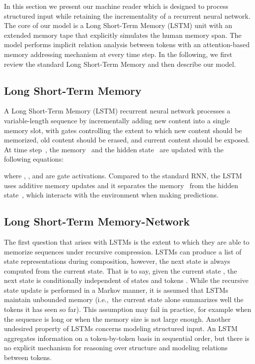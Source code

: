 \documentclass[11pt,letterpaper]{article}
\begin{document}
        In this section we present our machine reader which is
        designed to process structured input while retaining the
        incrementality of a recurrent neural network.  The core of our
        model is a Long Short-Term Memory (LSTM) unit with an extended
        memory tape that explicitly simulates the human memory
        span. The model performs implicit relation analysis between
        tokens with an attention-based memory addressing mechanism at
        every time step. In the following, we first review the
        standard Long Short-Term Memory and then describe our model.
	
	\subsection{Long Short-Term Memory}
	\label{sec:long-short-term-1}
	A Long Short-Term Memory (LSTM) recurrent neural network processes a
	variable-length sequence  by incrementally
	adding new content into a single memory slot, with gates controlling
	the extent to which new content should be memorized, old content
	should be erased, and current content should be exposed. At time
	step~, the memory~ and the hidden state~ are updated with
	the following equations:
	
	
	 
	where , , and  are gate activations. Compared to the
        standard RNN, the LSTM uses additive memory updates and it separates the memory~ from the
        hidden state~, which interacts with the environment when
        making predictions.
          
	 
	\subsection{Long Short-Term Memory-Network}
	\label{sec:long-short-term}
	The first question that arises with LSTMs is the extent to
        which they are able to memorize sequences under recursive
        compression.  LSTMs can produce a list of state
        representations during composition, however, the next state is
        always computed from the current state. That is to say, given
        the current state , the next state  is
        conditionally independent of states  and
        tokens .  While the recursive state update
        is performed in a Markov manner, it is assumed that LSTMs
        maintain unbounded memory (i.e.,~the current state alone
        summarizes well the tokens it has seen so far).  This
        assumption may fail in practice, for example when the sequence is
        long or when the memory size is not large enough.  Another
        undesired property of LSTMs concerns modeling structured
        input. An LSTM aggregates information on a token-by-token
        basis in sequential order, but there is no explicit mechanism for
        reasoning over structure and modeling relations between
        tokens.
\end{document}
